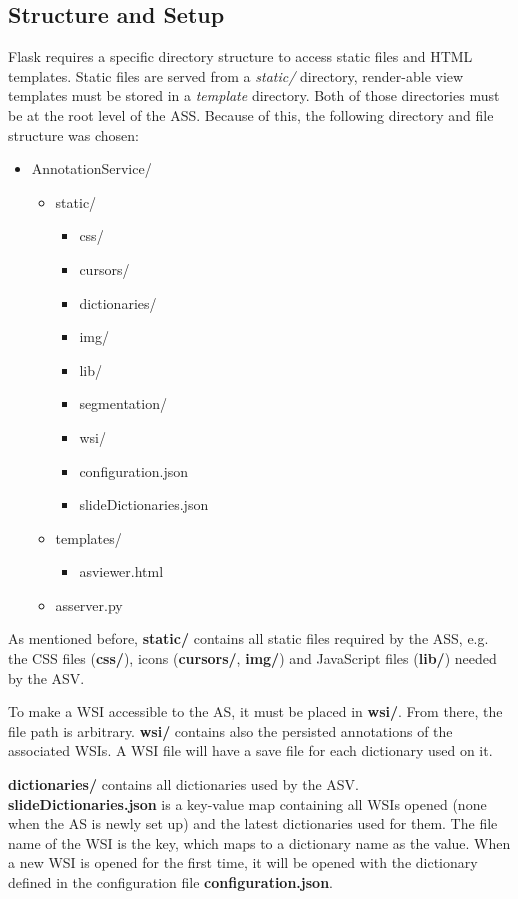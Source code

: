 \subsection{Structure and Setup}
\label{sec4_setup}
Flask requires a specific directory structure to access static files and HTML templates. Static files are served from a \emph{static/} directory, render-able view templates must be stored in a \emph{template} directory. Both of those directories must be at the root level of the ASS\cite{web:flask}. Because of this, the following directory and file structure was chosen:\clearpage
\begin{itemize}
	\item AnnotationService/
	\begin{itemize}
		\item static/
		\begin{itemize}
			\item css/
			\item cursors/
			\item dictionaries/
			\item img/
			\item lib/
			\item segmentation/
			\item wsi/
			\item configuration.json
			\item slideDictionaries.json
		\end{itemize}
		\item templates/
		\begin{itemize}
			\item as{\textunderscore}viewer.html
		\end{itemize}
		\item as{\textunderscore}server.py
	\end{itemize}
\end{itemize}

As mentioned before, \textbf{static/} contains all static files required by the ASS, e.g. the CSS files (\textbf{css/}), icons (\textbf{cursors/}, \textbf{img/}) and JavaScript files (\textbf{lib/}) needed by the ASV.

To make a WSI accessible to the AS, it must be placed in \textbf{wsi/}. From there, the file path is arbitrary. \textbf{wsi/} contains also the persisted annotations of the associated WSIs. A WSI file will have a save file for each dictionary used on it.

\textbf{dictionaries/} contains all dictionaries used by the ASV. \textbf{slideDictionaries.json} is a key-value map containing all WSIs opened (none when the AS is newly set up) and the latest dictionaries used for them. The file name of the WSI is the key, which maps to a dictionary name as the value. When a new WSI is opened for the first time, it will be opened with the dictionary defined in the configuration file \textbf{configuration.json}.


